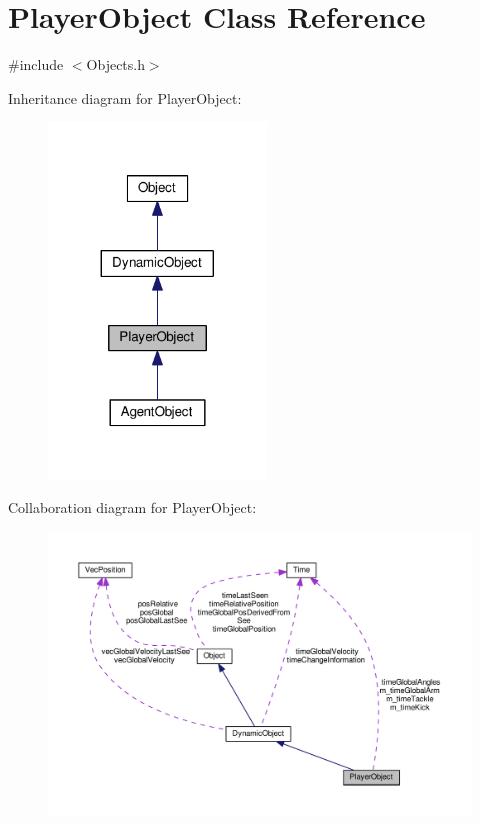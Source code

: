 \hypertarget{classPlayerObject}{}\section{Player\+Object Class Reference}
\label{classPlayerObject}


{\ttfamily \#include $<$Objects.\+h$>$}



Inheritance diagram for Player\+Object\+:
\nopagebreak
\begin{figure}[H]
\begin{center}
\leavevmode
\includegraphics[width=164pt]{classPlayerObject__inherit__graph}
\end{center}
\end{figure}


Collaboration diagram for Player\+Object\+:
\nopagebreak
\begin{figure}[H]
\begin{center}
\leavevmode
\includegraphics[width=350pt]{classPlayerObject__coll__graph}
\end{center}
\end{figure}
